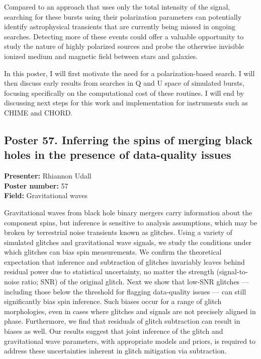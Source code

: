 Compared to an approach that uses only the total intensity of the signal, searching for these bursts using their polarization parameters can potentially identify astrophysical transients that are currently being missed in ongoing searches. Detecting more of these events could offer a valuable opportunity to study the nature of highly polarized sources and probe the otherwise invisible ionized medium and magnetic field between stars and galaxies.

In this poster, I will first motivate the need for a polarization-based search. I will then discuss early results from searches in Q and U space of simulated bursts, focusing specifically on the computational cost of these routines. I will end by discussing next steps for this work and implementation for instruments such as CHIME and CHORD.

\hypertarget{poster-abstract-talk-84}{}\label{poster-abstract-page-talk-84}
\subsection*{Poster 57. Inferring the spins of merging black holes in the presence of data-quality issues}
\textbf{Presenter:} Rhiannon Udall\\
\textbf{Poster number:} 57\\
\textbf{Field:} Gravitational waves

Gravitational waves from black hole binary mergers carry information about the component spins, but inference is sensitive to analysis assumptions, which may be broken by terrestrial noise transients known as glitches. Using a variety of simulated glitches and gravitational wave signals, we study the conditions under which glitches can bias spin measurements. We confirm the theoretical expectation that inference and subtraction of glitches invariably leaves behind residual power due to statistical uncertainty, no matter the strength (signal-to-noise ratio; SNR) of the original glitch. Next we show that low-SNR glitches --- including those below the threshold for flagging data-quality issues --- can still significantly bias spin inference. Such biases occur for a range of glitch morphologies, even in cases where glitches and signals are not precisely aligned in phase. Furthermore, we find that residuals of glitch subtraction can result in biases as well. Our results suggest that joint inference of the glitch and gravitational wave parameters, with appropriate models and priors, is required to address these uncertainties inherent in glitch mitigation via subtraction.

